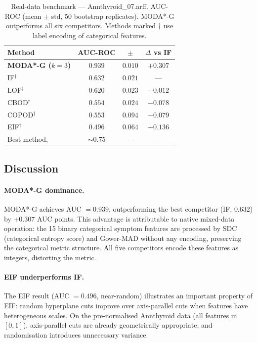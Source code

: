 \documentclass[11pt]{article}
\theoremstyle{plain}
\theoremstyle{definition}
\begin{document}
\begin{table}[ht]
\centering
\caption{Real-data benchmark --- Annthyroid\_07.arff.
  AUC-ROC (mean $\pm$ std, 50 bootstrap replicates).
  MODA*-G outperforms all six competitors.
  Methods marked $\dagger$ use label encoding of
  categorical features.}
\label{tab:realdata}
\small
\begin{tabular}{lccc}
\toprule
Method & AUC-ROC & $\pm$ & $\Delta$ vs IF \\
\midrule
\textbf{MODA*-G ($k=3$)} & $\mathbf{0.939}$ & $0.010$
  & $+0.307$ \\
IF$^\dagger$ & $0.632$ & $0.021$ & --- \\
LOF$^\dagger$ & $0.620$ & $0.023$ & $-0.012$ \\
CBOD$^\dagger$ & $0.554$ & $0.024$ & $-0.078$ \\
COPOD$^\dagger$ & $0.553$ & $0.094$ & $-0.079$ \\
EIF$^\dagger$ & $0.496$ & $0.064$ & $-0.136$ \\
\midrule
Best method, \citet{campos2016} & ${\sim}0.75$ &
  --- & --- \\
\bottomrule
\end{tabular}
\end{table}

\subsection{Discussion}

\paragraph{MODA*-G dominance.}
MODA*-G achieves AUC $= 0.939$, outperforming the
best competitor (IF, $0.632$) by $+0.307$ AUC points.
This advantage is attributable to native mixed-data
operation: the 15 binary categorical symptom features
are processed by SDC (categorical entropy score) and
Gower-MAD without any encoding, preserving the
categorical metric structure. All five competitors
encode these features as integers, distorting the
metric.

\paragraph{EIF underperforms IF.}
The EIF result (AUC $= 0.496$, near-random) illustrates
an important property of EIF: random hyperplane cuts
improve over axis-parallel cuts when features have
heterogeneous scales. On the pre-normalised Annthyroid
data (all features in $[0,1]$), axis-parallel cuts are
already geometrically appropriate, and randomisation
introduces unnecessary variance.
\end{document}
